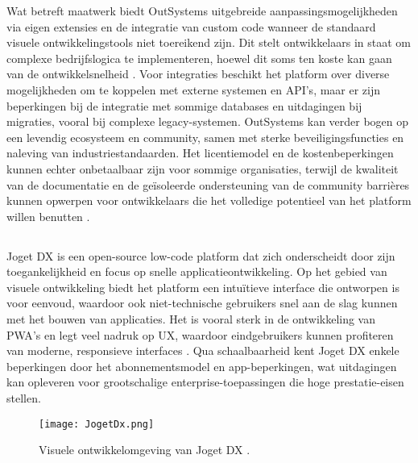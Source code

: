 Wat betreft maatwerk biedt OutSystems uitgebreide aanpassingsmogelijkheden via eigen extensies en de integratie van custom code wanneer de standaard visuele ontwikkelingstools niet toereikend zijn. Dit stelt ontwikkelaars in staat om complexe bedrijfslogica te implementeren, hoewel dit soms ten koste kan gaan van de ontwikkelsnelheid \autocite{Sido2024}. Voor integraties beschikt het platform over diverse mogelijkheden om te koppelen met externe systemen en API's, maar er zijn beperkingen bij de integratie met sommige databases en uitdagingen bij migraties, vooral bij complexe legacy-systemen. OutSystems kan verder bogen op een levendig ecosysteem en community, samen met sterke beveiligingsfuncties en naleving van industriestandaarden. Het licentiemodel en de kostenbeperkingen kunnen echter onbetaalbaar zijn voor sommige organisaties, terwijl de kwaliteit van de documentatie en de geïsoleerde ondersteuning van de community barrières kunnen opwerpen voor ontwikkelaars die het volledige potentieel van het platform willen benutten \autocite{Sido2024}.


\subsection{}
Joget DX is een open-source low-code platform dat zich onderscheidt door zijn toegankelijkheid en focus op snelle applicatieontwikkeling. Op het gebied van visuele ontwikkeling biedt het platform een intuïtieve interface die ontworpen is voor eenvoud, waardoor ook niet-technische gebruikers snel aan de slag kunnen met het bouwen van applicaties. Het is vooral sterk in de ontwikkeling van \gls{PWA}'s en legt veel nadruk op \gls{UX}, waardoor eindgebruikers kunnen profiteren van moderne, responsieve interfaces \autocite{Sido2024}. Qua schaalbaarheid kent Joget DX enkele beperkingen door het abonnementsmodel en app-beperkingen, wat uitdagingen kan opleveren voor grootschalige enterprise-toepassingen die hoge prestatie-eisen stellen.

\begin{figure}[H]
    \centering
    \texttt{[image: JogetDx.png]}
    \caption[Visuele ontwikkelomgeving Joget DX]{\label{fig:jogetDx} Visuele ontwikkelomgeving van Joget DX \autocite{Hugo2024}.}
\end{figure}

